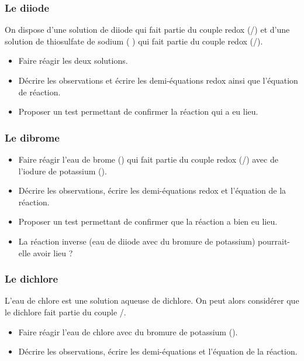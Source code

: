 \documentclass{tp}
\begin{document}
\subsubsection{Le diiode}%
\label{ssub:le_diiode}

On dispose d'une solution de diiode qui fait partie du couple redox (/) et d'une solution de thiosulfate de sodium ( ) qui fait partie du couple redox (/).

\begin{itemize}
  \item Faire réagir les deux solutions.
  \item Décrire les observations et écrire les demi-équations redox ainsi que l'équation de réaction. 
  \item Proposer un test permettant de confirmer la réaction qui a eu lieu.
\end{itemize}

\subsubsection{Le dibrome}%
\label{ssub:le_dibrome}

\begin{itemize}
  \item Faire réagir l'eau de brome () qui fait partie du couple redox (/) avec de l'iodure de potassium ().
  \item Décrire les observations, écrire les demi-équations redox et l'équation de la réaction.
  \item Proposer un test permettant de confirmer que la réaction a bien eu lieu.
  \item La réaction inverse (eau de diiode avec du bromure de potassium) pourrait-elle avoir lieu ?
\end{itemize}

\subsubsection{Le dichlore}%
\label{ssub:le_dichlore}

L'eau de chlore est une solution aqueuse de dichlore. On peut alors considérer que le dichlore fait partie du couple /.

\begin{itemize}
  \item Faire réagir l'eau de chlore avec du bromure de potassium ().
  \item Décrire les observations, écrire les demi-équations et l'équation de la réaction.
\end{itemize}
\end{document}
